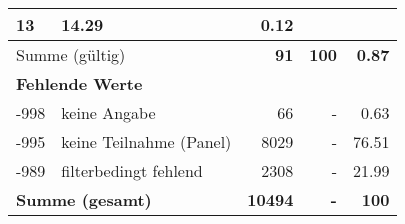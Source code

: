 \begin{longtable}{lXrrr}
       \num{13} &
       \num[round-mode=places,round-precision=2]{14,29} &
         \num[round-mode=places,round-precision=2]{0,12} \\
     \midrule
     \multicolumn{2}{l}{Summe (gültig)} &
       \textbf{\num{91}} &
     \textbf{100} &
       \textbf{\num[round-mode=places,round-precision=2]{0,87}} \\
     \multicolumn{5}{l}{\textbf{Fehlende Werte}}\\
       -998 &
       keine Angabe &
         \num{66} &
        - &
         \num[round-mode=places,round-precision=2]{0,63} \\
       -995 &
       keine Teilnahme (Panel) &
         \num{8029} &
        - &
         \num[round-mode=places,round-precision=2]{76,51} \\
       -989 &
       filterbedingt fehlend &
         \num{2308} &
        - &
         \num[round-mode=places,round-precision=2]{21,99} \\
     \midrule
     \multicolumn{2}{l}{\textbf{Summe (gesamt)}} &
          \textbf{\num{10494}} &
        \textbf{-} &
        \textbf{100} \\
     \bottomrule
     \end{longtable}
     

